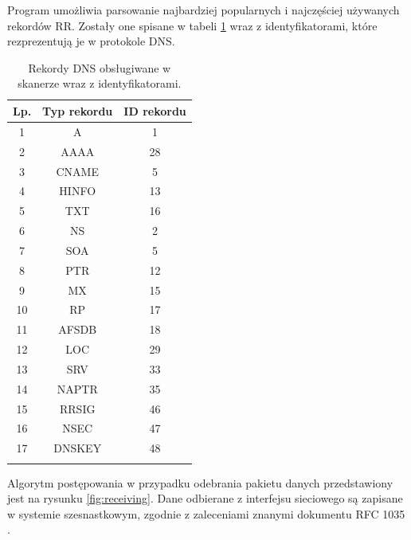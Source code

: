 Program umożliwia parsowanie najbardziej popularnych i najczęściej używanych rekordów RR. Zostały one spisane w tabeli \ref{records}
wraz z identyfikatorami, które rezprezentują je w protokole DNS.

\begin{longtable}{|c|c|c|}
	\hline
	\textbf{Lp.} &
	\textbf{Typ rekordu} &
	\textbf{ID rekordu} \\ \hline\hline
	1 & A & 1 \\
	2 & AAAA & 28 \\
    3 & CNAME & 5 \\
	4 & HINFO & 13 \\
	5 & TXT & 16 \\
	6 & NS & 2 \\
	7 & SOA & 5 \\
	8 & PTR & 12 \\
	9 & MX & 15 \\
	10 & RP & 17 \\
	11 & AFSDB & 18 \\
	12 & LOC & 29 \\
	13 & SRV & 33 \\
	14 & NAPTR & 35 \\
	15 & RRSIG & 46 \\
	16 & NSEC & 47 \\
	17 & DNSKEY & 48 \\
	\hline
	\caption{Rekordy DNS obsługiwane w skanerze wraz z identyfikatorami.}
	\label{records}
\end{longtable}

Algorytm postępowania w przypadku odebrania pakietu danych przedstawiony jest na rysunku \ref{fig:receiving}. Dane odbierane z interfejsu
sieciowego są zapisane w systemie szesnastkowym, zgodnie z zaleceniami znanymi dokumentu RFC 1035 \cite{RFC1035}.

